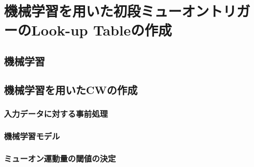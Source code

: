 \chapter{機械学習を用いた初段ミューオントリガーのLook-up Tableの作成}
\section{機械学習}

\section{機械学習を用いたCWの作成}
\subsection{入力データに対する事前処理}
\subsection{機械学習モデル}
\subsection{ミューオン運動量の閾値の決定}